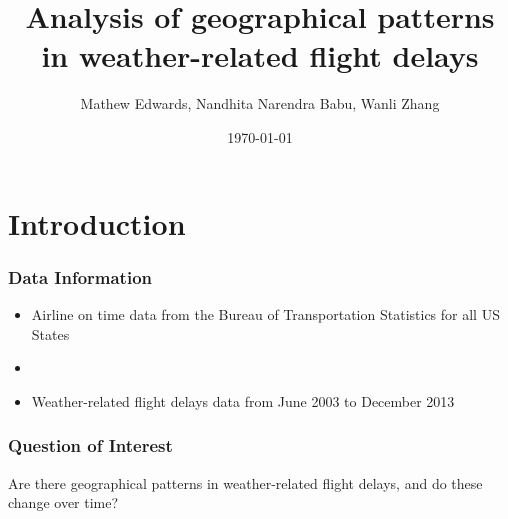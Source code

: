\documentclass{beamer}
\title{Analysis of geographical patterns in weather-related flight delays}
\author{Mathew Edwards, Nandhita Narendra Babu, Wanli Zhang}
\date{\today}
\begin{document}
\begin{frame}
\titlepage
\end{frame}

\begin{frame}{\contentsname}
\tableofcontents
\end{frame}

\section{Introduction}

\begin{frame}
\frametitle{Data Information}
\begin{itemize}
\item Airline on time data from the Bureau of Transportation Statistics for all US States

\item[]

\item Weather-related flight delays data from June 2003 to December 2013
\end{itemize}
\end{frame}


\begin{frame}
\frametitle{Question of Interest}
Are there geographical patterns in weather-related flight delays, and do these change over time?
\end{frame}


\end{document}

